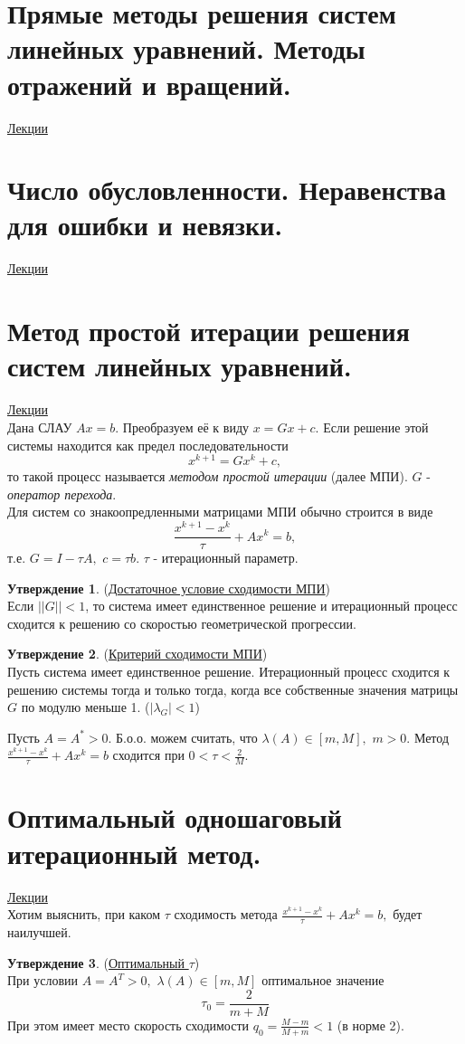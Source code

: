 \documentclass[specialist, subf, href, colorlinks=true, 12pt, times, mtpro, final]{disser}
\theoremstyle{definition}
\newtheorem{state}{Утверждение}[section]
\begin{document}
\section {Прямые методы решения систем линейных уравнений. Методы отражений и вращений.}
	\hyperlink {lects.54}{Лекции}\\

\section {Число обусловленности. Неравенства для ошибки и невязки.}
	\hyperlink {lects.56}{Лекции}\\

\section {Метод простой итерации решения систем линейных уравнений.}
	\hyperlink {lects.58}{Лекции}\\
	Дана СЛАУ $Ax = b$. Преобразуем её к виду $x = Gx + c$. Если решение этой системы находится как предел последовательности
	$$
	    x^{k+1} = Gx^{k} + c,
	$$
	то такой процесс называется {\it методом простой итерации} (далее МПИ). $G$ - {\it оператор перехода}.\\
	Для систем со знакоопредленными матрицами МПИ обычно строится в виде
	$$
	    \frac{x^{k+1} - x^{k}}{\tau} + Ax^{k} = b,
	$$
	т.е. $G = I - \tau A, \,\, c = \tau b$. $\tau$ - итерационный параметр.
	\begin{state} (\hyperlink {lects.58}{Достаточное условие сходимости МПИ})\\
	Если $||G|| < 1$, то система имеет единственное решение и итерационный процесс сходится
	к решению со скоростью геометрической прогрессии.
	\end{state}
    \begin{state} (\hyperlink {lects.59}{Критерий сходимости МПИ})\\
    Пусть система имеет единственное решение. Итерационный процесс сходится к решению системы тогда и только тогда, когда все собственные значения матрицы $G$ по модулю меньше 1. ($|\lambda_{G}| < 1$)
    \end{state}
    Пусть $A = A^* > 0$. Б.о.о. можем считать, что $\lambda(A) \in [m, M],\,\, m > 0$.
    Метод $ \frac{x^{k+1} - x^{k}}{\tau} + Ax^{k} = b$ сходится при $0 < \tau < \frac{2}{M}$.

\newpage
\section {Оптимальный одношаговый итерационный метод.}
	\hyperlink {lects.60}{Лекции}\\
	Хотим выяснить, при каком $\tau$ сходимость метода
	$\frac{x^{k+1} - x^{k}}{\tau} + Ax^{k} = b,$ будет наилучшей.
	\begin{state} (\hyperlink {lects.60}{Оптимальный $\tau$})\\
	При условии $A = A^T > 0, \,\, \lambda(A) \in [m, M]$ оптимальное значение
	$$\tau_0 = \frac{2}{m+M}$$
	При этом имеет место скорость сходимости $q_0 = \frac{M-m}{M+m} < 1$ (в норме 2).
	\end{state}
\end{document}
